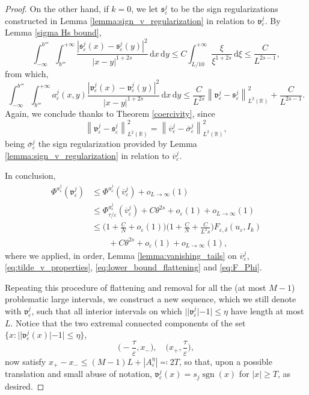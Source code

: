 \documentclass{article}
\theoremstyle{definition}
\newcommand{\norm}[1]{\left\lVert #1 \right\rVert}
\newcommand{\abs}[1]{\left|#1\right|}
\newcommand{\de}{\mathrm{d}}
\newcommand{\R}{\mathbb{R}}
\newcommand{\e}{\varepsilon}
\def\e{\varepsilon}
\newcommand{\sgn}{\operatorname{sgn}}
\begin{document}
\begin{proof}
    {On the other hand, if $k=0$, we let $\mathfrak{s}^j_\e$ to be the sign regularizations constructed in Lemma \ref{lemma:sign_v_regularization} in relation to $\mathfrak{v}^j_\e$. By Lemma \ref{sigma Hs bound}, 
    \[
       \int_{-\infty}^{b'''}\int_{b'''}^{+\infty} \frac{|\mathfrak{s}^j_\e(x)-\mathfrak{s}_\e^j(y)|^2}{\abs{x-y}^{1+2s}}\,\de x\,\de y
        \leq C\int_{L/10}^{+\infty}\frac{\xi}{\xi^{1+2s}}\,\de \xi \leq \frac{C}{L^{2s-1}},
    \]
    from which,
    \[
        \int_{-\infty}^{b'''}\int_{b'''}^{+\infty} a_\e^j(x,y) \frac{\abs{\mathfrak{v}_\e^j(x)-\mathfrak{v}_\e^j(y)}^2}{\abs{x-y}^{1+2s}}\,\de x\,\de y\leq \frac{C}{L^{2s}}\norm{\mathfrak{v}_\e^j-\mathfrak{s}_\e^j}^2_{L^2(\R)} + \frac{C}{L^{2s-1}}.
    \]
    }
    Again, we conclude thanks to Theorem \ref{coercivity}, since
\[\norm{\mathfrak{v}_\e^j-\mathfrak{s}_\e^j}^2_{L^2(\R)} =\norm{\overline{v}_\e^j-\overline{\sigma}_\e^j}^2_{L^2(\R)},\]
  being $\overline{\sigma}^j_\e$ the sign regularization provided by Lemma \ref{lemma:sign_v_regularization} in relation to $\overline{v}^j_\e$.  
  
    In conclusion, 
 \begin{equation}
     \label{eq:energy_v_slashed}
     \begin{split}
            \Phi^{a^{j}_{\scriptstyle\e}}(\mathfrak{v}_\e^j ) &\leq \Phi^{a_{\scriptstyle\e}^j}\left(\overline{v}_\e^j\right) + o_{L\to \infty}(1)\\
        &\leq \Phi^{a_{\scriptstyle\e}^j}_{\tau/\e}\left(\overline{v}_\e^j\right) + C\theta^{2s}+o_\e(1)+o_{L\to \infty}(1)\\
        &\leq \Big(1+\frac{C}{N}+o_\e(1)\Big)\Big(1+\frac{C}{N}+\frac{C}{L^2s}\Big)F_{\e,\delta}(u_\e,I_k) \\
        &\qquad+ C\theta^{2s}+o_\e(1)+o_{L\to \infty}(1),
     \end{split}
 \end{equation}
 where we applied, in order, Lemma \ref{lemma:vanishing_tails} on  $\overline{v}_\e^j$, \eqref{eq:tilde_v_properties}, \eqref{eq:lower_bound_flattening} and \eqref{eq:F_Phi}.

    Repeating this procedure of flattening and removal for all the (at most $M-1$) problematic large intervals, we construct a new sequence, which we still denote with $\mathfrak{v}_\e^{j}$, such that all interior intervals on which $||\mathfrak{v}_\e^{j}|-1|\leq \eta$ have length at most $L$. 
    Notice that the two extremal connected components of the set $\{x\colon||\mathfrak v^j_\e(x)|-1|\leq \eta\}$, 
\[\Big({-}\frac{\tau}{\e}, x_-\Big),\quad  \Big(x_+,\frac{\tau}{\e}\Big),\] 
now satisfy $x_+-x_-\leq (M-1)L+ |A_\e^\eta|\eqqcolon 2T$, so that, upon a possible translation and small abuse of notation, $\mathfrak v^j_\e(x)=s_j \sgn(x)$ for $|x|\geq T$, as desired.
    

\end{proof}
\end{document}
